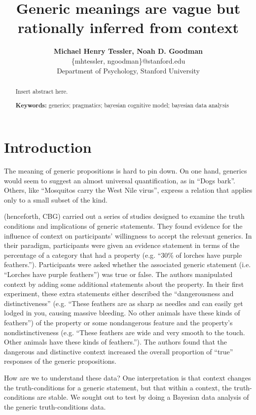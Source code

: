 \documentclass[10pt,letterpaper]{article}
\title{Generic meanings are vague but rationally inferred from context}
\author{{\large \bf Michael Henry Tessler, Noah D. Goodman } \\
	\{mhtessler, ngoodman\}@stanford.edu \\
  Department of Psychology, Stanford University}
\begin{document}
\maketitle


\begin{abstract}
Insert abstract here.

\textbf{Keywords:} 
generics; pragmatics; bayesian cognitive model; bayesian data analysis
\end{abstract}

\section{Introduction}

The meaning of generic propositions is hard to pin down. On one hand, generics would seem to suggest an almost universal quantification, as in ``Dogs bark''. Others, like ``Mosquitos carry the West Nile virus'', express a relation that applies only to a small subset of the kind. 

 (henceforth, CBG) carried out a series of studies designed to examine the truth conditions and implications of generic statements. They found evidence for the influence of context on participants' willingness to accept the relevant generics. In their paradigm, participants were given an evidence statement in terms of the percentage of a category that had a property (e.g. ``30\% of lorches have purple feathers.''). Participants were asked whether the associated generic statement (i.e. ``Lorches have purple feathers'') was true or false. The authors manipulated context by adding some additional statements about the property. In their first experiment, these extra statements either described the ``dangerousness and distinctiveness'' (e.g. ``These feathers are as sharp as needles and can easily get lodged in you, causing massive bleeding. No other animals have these kinds of feathers'') of the property or some nondangerous feature and the property's nondistinctiveness (e.g.  ``These feathers are wide and very smooth to the touch. Other animals have these kinds of feathers.''). The authors found that the dangerous and distinctive context increased the overall proportion of ``true'' responses of the generic propositions.

How are we to understand these data? One interpretation is that context changes the truth-conditions for a generic statement, but that within a context, the truth-conditions are stable. We sought out to test by doing a Bayesian data analysis of the generic truth-conditions data. 
\end{document}
